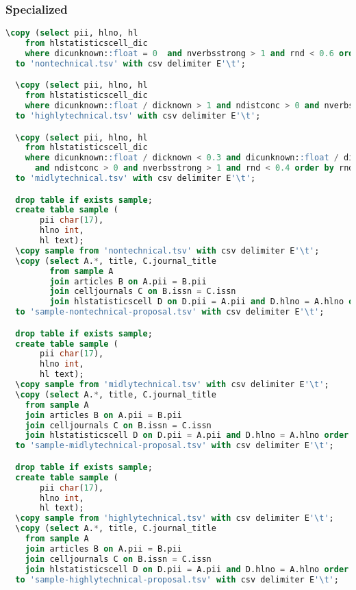 \documentclass[a4paper,11pt]{report}
\begin{document}
\subsubsection*{Specialized}
\begin{lstlisting}[language=SQL]
  \copy (select pii, hlno, hl
    from hlstatisticscell_dic
    where dicunknown::float = 0  and nverbsstrong > 1 and rnd < 0.6 order by rnd)
  to 'nontechnical.tsv' with csv delimiter E'\t';

  \copy (select pii, hlno, hl
    from hlstatisticscell_dic
    where dicunknown::float / dicknown > 1 and ndistconc > 0 and nverbsstrong > 1 order by rnd)
  to 'highlytechnical.tsv' with csv delimiter E'\t';

  \copy (select pii, hlno, hl
    from hlstatisticscell_dic
    where dicunknown::float / dicknown < 0.3 and dicunknown::float / dicknown > 0.2
      and ndistconc > 0 and nverbsstrong > 1 and rnd < 0.4 order by rnd)
  to 'midlytechnical.tsv' with csv delimiter E'\t';

  drop table if exists sample;
  create table sample (
       pii char(17),
       hlno int,
       hl text);
  \copy sample from 'nontechnical.tsv' with csv delimiter E'\t';
  \copy (select A.*, title, C.journal_title
         from sample A
         join articles B on A.pii = B.pii
         join celljournals C on B.issn = C.issn
         join hlstatisticscell D on D.pii = A.pii and D.hlno = A.hlno order by D.rnd)
  to 'sample-nontechnical-proposal.tsv' with csv delimiter E'\t';

  drop table if exists sample;
  create table sample (
       pii char(17),
       hlno int,
       hl text);
  \copy sample from 'midlytechnical.tsv' with csv delimiter E'\t';
  \copy (select A.*, title, C.journal_title
    from sample A
    join articles B on A.pii = B.pii
    join celljournals C on B.issn = C.issn
    join hlstatisticscell D on D.pii = A.pii and D.hlno = A.hlno order by D.rnd)
  to 'sample-midlytechnical-proposal.tsv' with csv delimiter E'\t';

  drop table if exists sample;
  create table sample (
       pii char(17),
       hlno int,
       hl text);
  \copy sample from 'highlytechnical.tsv' with csv delimiter E'\t';
  \copy (select A.*, title, C.journal_title
    from sample A
    join articles B on A.pii = B.pii
    join celljournals C on B.issn = C.issn
    join hlstatisticscell D on D.pii = A.pii and D.hlno = A.hlno order by D.rnd)
  to 'sample-highlytechnical-proposal.tsv' with csv delimiter E'\t';
\end{lstlisting}
\end{document}
